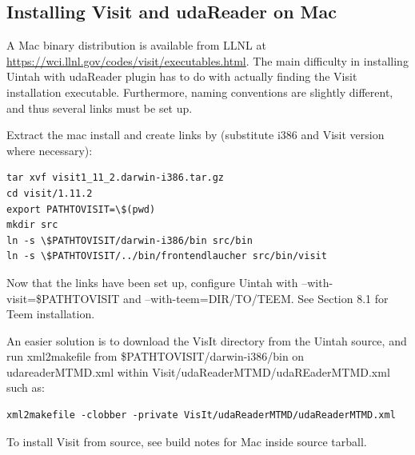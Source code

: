 \documentclass[12pt]{article}
\begin{document}
\subsection{Installing Visit and udaReader on Mac}

A Mac binary distribution is available from LLNL at \url{https://wci.llnl.gov/codes/visit/executables.html}.  The main difficulty in installing Uintah with udaReader plugin has to do with actually finding the Visit installation executable.  Furthermore, naming conventions are slightly different, and thus several links must be set up.

Extract the mac install and create links by (substitute i386 and Visit version where necessary):

\begin{verbatim}
tar xvf visit1_11_2.darwin-i386.tar.gz
cd visit/1.11.2
export PATHTOVISIT=\$(pwd)
mkdir src
ln -s \$PATHTOVISIT/darwin-i386/bin src/bin
ln -s \$PATHTOVISIT/../bin/frontendlaucher src/bin/visit
\end{verbatim}

Now that the links have been set up, configure Uintah with --with-visit=\$PATHTOVISIT and --with-teem=DIR/TO/TEEM.  See Section 8.1 for Teem installation.

An easier solution is to download the VisIt directory from the Uintah source, and run xml2makefile from \$PATHTOVISIT/darwin-i386/bin on udareaderMTMD.xml within Visit/udaReaderMTMD/udaREaderMTMD.xml such as:

\begin{verbatim}
xml2makefile -clobber -private VisIt/udaReaderMTMD/udaReaderMTMD.xml
\end{verbatim}

To install Visit from source, see build notes for Mac inside source tarball.
\end{document}
